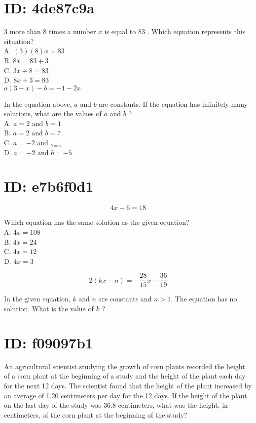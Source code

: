 








\section*{ID: 4de87c9a}
3 more than 8 times a number $x$ is equal to 83 . Which equation represents this situation?\\
A. $(3)(8) x=83$\\
B. $8 x=83+3$\\
C. $3 x+8=83$\\
D. $8 x+3=83$\\
$a(3-x)-b=-1-2 x$

In the equation above, $a$ and $b$ are constants. If the equation has infinitely many solutions, what are the values of $a$ and $b$ ?\\
A. $a=2$ and $b=1$\\
B. $a=2$ and $b=7$\\
C. $a=-2$ and $_{b=5}$\\
D. $a=-2$ and $b=-5$

\section*{ID: e7b6f0d1}
$$
4 x+6=18
$$

Which equation has the same solution as the given equation?\\
A. $4 x=108$\\
B. $4 x=24$\\
C. $4 x=12$\\
D. $4 x=3$

$$
2(k x-n)=-\frac{28}{15} x-\frac{36}{19}
$$

In the given equation, $k$ and $n$ are constants and $n>1$. The equation has no solution. What is the value of $k$ ?

\section*{ID: f09097b1}
An agricultural scientist studying the growth of corn plants recorded the height of a corn plant at the beginning of a study and the height of the plant each day for the next 12 days. The scientist found that the height of the plant increased by an average of 1.20 centimeters per day for the 12 days. If the height of the plant on the last day of the study was 36.8 centimeters, what was the height, in centimeters, of the corn plant at the beginning of the study?

